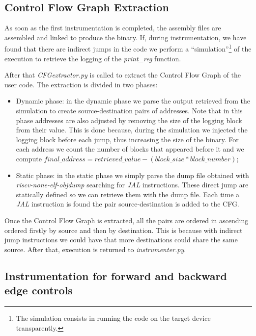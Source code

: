 \subsection{Control Flow Graph Extraction}
\label{subsec:project_cfgextraction}

As soon as the first instrumentation is completed, the assembly files are assembled
and linked to produce the binary. If, during instrumentation, we have found that
there are indirect jumps in the code we perform a ``simulation''\footnote{The
simulation consists in running the code on the target device transparently.} of the
execution to retrieve the logging of the \textit{print\_reg} function.

After that \textit{CFGextractor.py} is called to extract the Control Flow Graph of
the user code. The extraction is divided in two phases:
\begin{itemize}
  \item Dynamic phase: in the dynamic phase we parse the output retrieved from
    the simulation to create source-destination pairs of addresses. Note that in
    this phase addresses are also adjusted by removing the size of the logging block
    from their value. This is done because, during the simulation we injected the
    logging block before each jump, thus increasing the size of the binary. For each
    address we count the number of blocks that appeared before it and we compute
    $\textit{final\_address}= \textit{retrieved\_value}- (\textit{block\_size}* \textit
    {block\_number})$;

  \item Static phase: in the static phase we simply parse the dump file obtained
    with \textit{riscv-none-elf-objdump} searching for \textit{JAL} instructions.
    These direct jump are statically defined so we can retrieve them with the dump
    file. Each time a \textit{JAL} instruction is found the pair source-destination
    is added to the CFG.
\end{itemize}

Once the Control Flow Graph is extracted, all the pairs are ordered in ascending
ordered firstly by source and then by destination. This is because with indirect
jump instructions we could have that more destinations could share the same
source. After that, execution is returned to \textit{instrumenter.py}.

\subsection{Instrumentation for forward and backward edge controls}
\label{subsec:project_instrcontrols}

